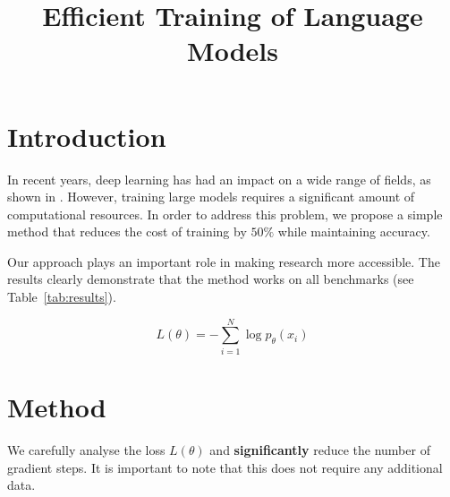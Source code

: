 \documentclass{article}
\title{Efficient Training of Language Models}
\begin{document}
\maketitle

\section{Introduction}
In recent years, deep learning has had an impact on a wide range of fields, as shown in \cite{lecun2015}. However, training large models requires a significant amount of computational resources. In order to address this problem, we propose a simple method that reduces the cost of training by $50\%$ while maintaining accuracy.

Our approach plays an important role in making research more accessible. The results clearly demonstrate that the method works on all benchmarks (see Table~\ref{tab:results}).

\begin{equation}
  L(\theta) = -\sum_{i=1}^{N} \log p_\theta(x_i)
\end{equation}

\section{Method}
We carefully analyse the loss $L(\theta)$ and \textbf{significantly} reduce the number of gradient steps. It is important to note that this does not require any additional data.
\end{document}
